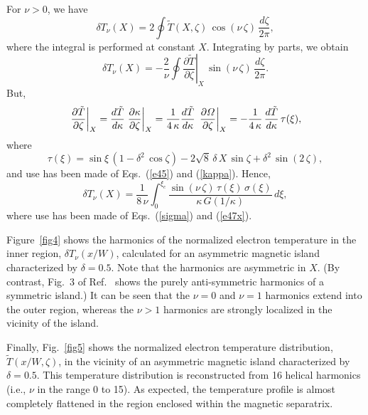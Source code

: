 \documentclass[12pt,prb,aps]{revtex4-1}
\begin{document}
For $\nu>0$, we have
\begin{equation}
\delta T_\nu(X) = 2\oint\tilde{T}(X,\zeta)\,\cos(\nu\,\zeta)\,\frac{d\zeta}{2\pi},
\end{equation}
where the integral is performed at constant $X$. 
Integrating by parts, we obtain
\begin{equation}
\delta T_\nu(X) = -\frac{2}{\nu}\oint\left.\frac{\partial \tilde{T}}{\partial\zeta}\right|_X\,\sin(\nu\,\zeta)\,\frac{d\zeta}{2\pi}.
\end{equation}
But,
\begin{equation}
\left.\frac{\partial \tilde{T}}{\partial\zeta}\right|_X=\frac{d\tilde{T}}{d\kappa}\left.\frac{\partial \kappa}{\partial\zeta}\right|_{X}
=\frac{1}{4\,\kappa}\frac{d\tilde{T}}{d\kappa}\,\left.\frac{\partial {\mit\Omega}}{\partial\zeta}\right|_{X}=-\frac{1}{4\,\kappa}\,\frac{d\tilde{T}}{d\kappa}\,\tau(\xi),
\end{equation}
where
\begin{equation}
\tau(\xi) = \sin\xi\,(1-\delta^2\,\cos\zeta)  -2\sqrt{8}\,\delta\,X\,\sin\zeta +\delta^2\,\sin(2\,\zeta),
\end{equation}
and use has been made of Eqs.~(\ref{e45}) and (\ref{kappa}). 
Hence,
\begin{equation}
\delta T_\nu(X) =\frac{1}{8\,\nu}\int_0^{\xi_c}\frac{\sin(\nu\,\zeta)\,\tau(\xi)\,\sigma(\xi)}{\kappa\,G(1/\kappa)}\,d\xi,
\end{equation}
where use has been made of Eqs.~(\ref{sigma}) and (\ref{e47x}).

Figure~\ref{fig4} shows the harmonics of the normalized electron temperature  in the inner region, $\delta T_\nu(x/W)$, calculated for an asymmetric
magnetic island characterized by $\delta=0.5$.  Note that the harmonics are asymmetric in $X$. (By contrast, Fig.~3 of Ref.~ shows
the purely anti-symmetric harmonics of a symmetric island.) It can be seen that the $\nu=0$ and $\nu=1$ harmonics extend into the outer region, whereas the
$\nu>1$ harmonics are strongly localized in the vicinity of the island. 

Finally, Fig.~\ref{fig5} shows the normalized electron temperature distribution, $\tilde{T}(x/W,\zeta)$, in the vicinity of an asymmetric magnetic island  characterized by
$\delta = 0.5$. This temperature distribution
is reconstructed from 16 helical harmonics (i.e., $\nu$ in the range 0 to 15). As expected, the temperature profile is almost completely flattened in the region enclosed  within the magnetic separatrix. 
\end{document}
